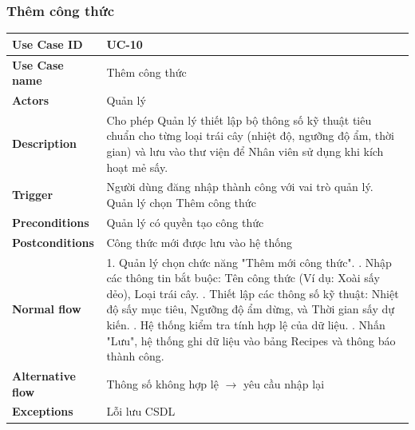 \subsubsection{Thêm công thức}
\begin{tabular}{|p{3.5cm}|p{9.5cm}|}
\hline
\textbf{Use Case ID} & UC-10 \\
\hline
\textbf{Use Case name} & Thêm công thức \\
\hline
\textbf{Actors} & Quản lý \\
\hline
\textbf{Description} & 
Cho phép Quản lý thiết lập bộ thông số kỹ thuật tiêu chuẩn cho từng loại trái cây (nhiệt độ, ngưỡng độ ẩm, thời gian) và lưu vào thư viện để Nhân viên sử dụng khi kích hoạt mẻ sấy. \\
\hline
\textbf{Trigger} & Người dùng đăng nhập thành công với vai trò quản lý. Quản lý chọn Thêm công thức \\
\hline
\textbf{Preconditions} & Quản lý có quyền tạo công thức \\
\hline
\textbf{Postconditions} & Công thức mới được lưu vào hệ thống \\
\hline
\textbf{Normal flow} & 
1. Quản lý chọn chức năng "Thêm mới công thức". \newline
 2. Nhập các thông tin bắt buộc: Tên công thức (Ví dụ: Xoài sấy dẻo), Loại trái cây. \newline
3. Thiết lập các thông số kỹ thuật: Nhiệt độ sấy mục tiêu, Ngưỡng độ ẩm dừng, và Thời gian sấy dự kiến. \newline
4. Hệ thống kiểm tra tính hợp lệ của dữ liệu. \newline
5. Nhấn "Lưu", hệ thống ghi dữ liệu vào bảng Recipes và thông báo thành công.\\
\hline
\textbf{Alternative flow} & 
Thông số không hợp lệ $\rightarrow$ yêu cầu nhập lại \\
\hline
\textbf{Exceptions} & Lỗi lưu CSDL \\
\hline
\end{tabular}

